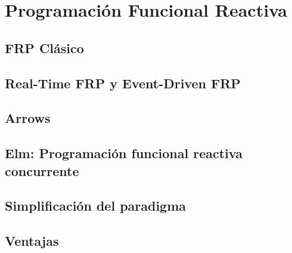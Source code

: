 
\section{Programación Funcional Reactiva}



\subsection{FRP Clásico}



\subsection{Real-Time FRP y Event-Driven FRP}


\subsection{Arrows}


\subsection{Elm: Programación funcional reactiva concurrente}

   
\subsection{Simplificación del paradigma}


\subsection{Ventajas} 



